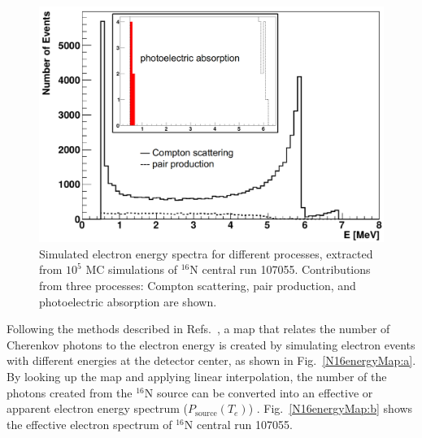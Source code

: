 \begin{figure}[htbp]
	\centering
	\includegraphics[width=12cm]{N16_MCenergySpectrum.png}
	\caption[Simulated electron energy spectra for different processes.]{Simulated electron energy spectra for different processes, extracted from $10^5$ MC simulations of $^{16}$N central run 107055. Contributions from three processes: Compton scattering, pair production, and photoelectric absorption are shown.\label{fig:N16nhitsSimu}}
\end{figure}

Following the methods described in Refs.~\cite{waterunidoc,morganThesis}, a map that relates the number of Cherenkov photons to the electron energy is created by simulating electron events with different energies at the detector center, as shown in Fig.~\ref{N16energyMap:a}. By looking up the map and applying linear interpolation, the number of the photons created from the $^{16}$N source can be converted into an effective or apparent electron energy spectrum ($P_\mathrm{source}(T_e)$) \cite{waterunidoc}. Fig.~\ref{N16energyMap:b} shows the effective electron spectrum of $^{16}$N central run 107055.



